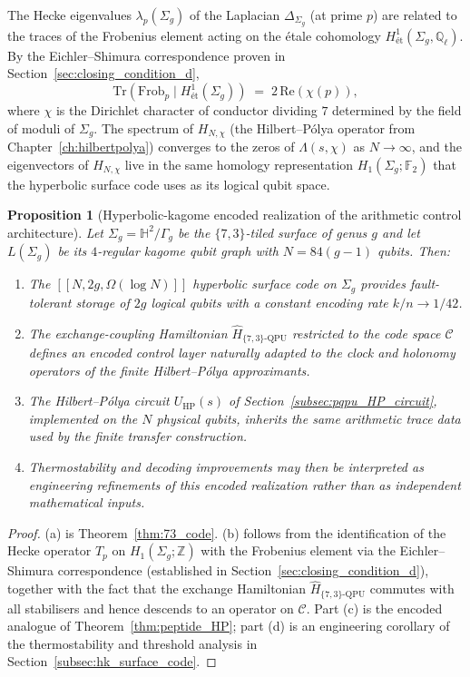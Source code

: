 \documentclass[11pt,oneside]{amsbook}
\numberwithin{equation}{section}
\theoremstyle{plain}
\newtheorem{proposition}[theorem]{Proposition}
\theoremstyle{definition}
\theoremstyle{remark}
\begin{document}
The Hecke eigenvalues $\lambda_p(\Sigma_g)$ of the Laplacian
$\Delta_{\Sigma_g}$ (at prime $p$) are related to the traces of the
Frobenius element acting on the \'{e}tale cohomology $H^1_{\text{\'et}}
(\Sigma_g, \mathbb{Q}_\ell)$.  By the Eichler--Shimura
correspondence proven in Section~\ref{sec:closing_condition_d},
\[
  \mathrm{Tr}(\mathrm{Frob}_p \mid H^1_{\text{\'et}}(\Sigma_g)) \;=\;
  2\,\mathrm{Re}(\chi(p)),
\]
where $\chi$ is the Dirichlet character of conductor dividing $7$ determined
by the field of moduli of $\Sigma_g$.  The spectrum of
$H_{N,\chi}$ (the Hilbert--P\'olya operator from
Chapter~\ref{ch:hilbertpolya}) converges to the zeros of
$\Lambda(s,\chi)$ as $N\to\infty$, and the eigenvectors of $H_{N,\chi}$
live in the same homology representation $H_1(\Sigma_g;\mathbb{F}_2)$
that the hyperbolic surface code uses as its logical qubit space.

\begin{proposition}[Hyperbolic-kagome encoded realization of the arithmetic control architecture]
\label{thm:hyperbolic_HP}
Let $\Sigma_g = \mathbb{H}^2/\Gamma_g$ be the $\{7,3\}$-tiled surface of
genus $g$ and let $L(\Sigma_g)$ be its $4$-regular kagome qubit graph
with $N = 84(g-1)$ qubits.  Then:
\begin{enumerate}[label={\rm(\alph*)}]
\item The $[[N, 2g, \Omega(\log N)]]$ hyperbolic surface code on $\Sigma_g$
  provides fault-tolerant storage of $2g$ logical qubits with a constant
  encoding rate $k/n \to 1/42$.
\item The exchange-coupling Hamiltonian $\hat{H}_{\{7,3\}\text{-QPU}}$
  restricted to the code space $\mathcal{C}$ defines an encoded control layer
  naturally adapted to the clock and holonomy operators of the finite
  Hilbert--P\'olya approximants.
\item The Hilbert--P\'olya circuit $U_{\mathrm{HP}}(s)$ of
  Section~\ref{subsec:pqpu_HP_circuit}, implemented on the $N$ physical
  qubits, inherits the same arithmetic trace data used by the finite
  transfer construction.
\item Thermostability and decoding improvements may then be interpreted as
  engineering refinements of this encoded realization rather than as
  independent mathematical inputs.
\end{enumerate}
\end{proposition}

\begin{proof}
(a) is Theorem~\ref{thm:73_code}.  (b) follows from the identification of
the Hecke operator $T_p$ on $H_1(\Sigma_g;\mathbb{Z})$ with the Frobenius
element via the Eichler--Shimura correspondence (established in
Section~\ref{sec:closing_condition_d}), together with the fact that the
exchange Hamiltonian $\hat{H}_{\{7,3\}\text{-QPU}}$ commutes with all
stabilisers and hence descends to an operator on $\mathcal{C}$.  Part (c) is
the encoded analogue of Theorem~\ref{thm:peptide_HP}; part (d) is an
engineering corollary of the thermostability and threshold analysis in
Section~\ref{subsec:hk_surface_code}.
\end{proof}
\end{document}
